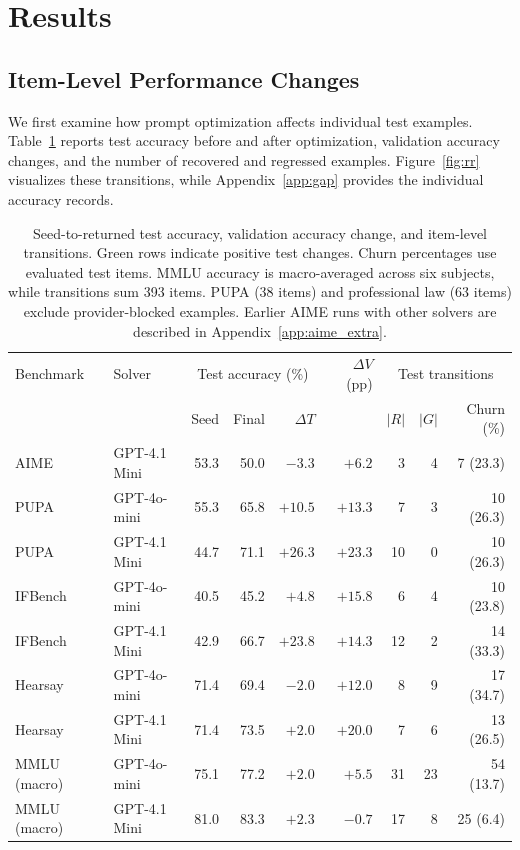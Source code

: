 \documentclass[11pt]{article}
\begin{document}
\section{Results}
\label{sec:results}

\subsection{Item-Level Performance Changes}
\label{sec:itemresults}

We first examine how prompt optimization affects individual test examples. Table~\ref{tab:main} reports test accuracy before and after optimization, validation accuracy changes, and the number of recovered and regressed examples. Figure~\ref{fig:rr} visualizes these transitions, while Appendix~\ref{app:gap} provides the individual accuracy records.

\begin{table}[!t]
\centering
\small
\setlength{\tabcolsep}{4pt}
\begin{tabular}{llrrrrrrr}
\toprule
\rowcolor{midblue}
Benchmark & Solver & \multicolumn{3}{c}{Test accuracy (\%)} &
\shortstack{$\Delta V$\\(pp)} &
\multicolumn{3}{c}{Test transitions} \\
\cmidrule(lr){3-5}\cmidrule(lr){7-9}
& & Seed & Final & $\Delta T$ & & $|R|$ & $|G|$ & Churn (\%) \\
\midrule
AIME & GPT-4.1 Mini & 53.3 & 50.0 & $-3.3$ & $+6.2$ & 3 & 4 & 7 (23.3) \\
\rowcolor{softgreen}
PUPA & GPT-4o-mini & 55.3 & 65.8 & $+10.5$ & $+13.3$ & 7 & 3 & 10 (26.3) \\
\rowcolor{softgreen}
PUPA & GPT-4.1 Mini & 44.7 & 71.1 & $+26.3$ & $+23.3$ & 10 & 0 & 10 (26.3) \\
\rowcolor{softgreen}
IFBench & GPT-4o-mini & 40.5 & 45.2 & $+4.8$ & $+15.8$ & 6 & 4 & 10 (23.8) \\
\rowcolor{softgreen}
IFBench & GPT-4.1 Mini & 42.9 & 66.7 & $+23.8$ & $+14.3$ & 12 & 2 & 14 (33.3) \\
Hearsay & GPT-4o-mini & 71.4 & 69.4 & $-2.0$ & $+12.0$ & 8 & 9 & 17 (34.7) \\
\rowcolor{softgreen}
Hearsay & GPT-4.1 Mini & 71.4 & 73.5 & $+2.0$ & $+20.0$ & 7 & 6 & 13 (26.5) \\
\rowcolor{softgreen}
MMLU (macro) & GPT-4o-mini & 75.1 & 77.2 & $+2.0$ & $+5.5$ & 31 & 23 & 54 (13.7) \\
\rowcolor{softgreen}
MMLU (macro) & GPT-4.1 Mini & 81.0 & 83.3 & $+2.3$ & $-0.7$ & 17 & 8 & 25 (6.4) \\
\bottomrule
\end{tabular}
\caption{Seed-to-returned test accuracy, validation accuracy change, and item-level transitions. Green rows indicate positive test changes. Churn percentages use evaluated test items. MMLU accuracy is macro-averaged across six subjects, while transitions sum 393 items. PUPA (38 items) and professional law (63 items) exclude provider-blocked examples. Earlier AIME runs with other solvers are described in Appendix~\ref{app:aime_extra}.}
\label{tab:main}
\end{table}
\end{document}
